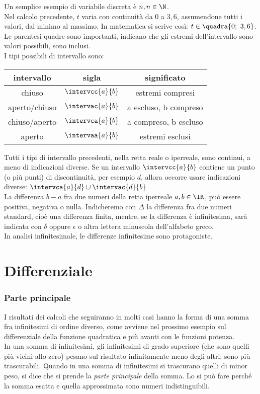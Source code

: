 Un semplice esempio di variabile discreta è $n, n\in \N$.\\
Nel calcolo precedente, $t$ varia con continuità da $0$ a $3,6$,
assumendone tutti i valori, dal minimo al massimo. In matematica si scrive 
così:
\(t\in \quadra{0;\ 3,6}\). Le parentesi quadre sono importanti, indicano che 
gli estremi
dell'intervallo sono valori possibili, sono inclusi.\\
I tipi possibili di intervallo sono:

\begin{center}
\begin{tabular}{ccc}\toprule
intervallo & sigla & significato\\\midrule
chiuso &$\intervcc{a}{b}$  & estremi compresi\\
aperto/chiuso & $\intervac{a}{b}$ & a escluso, b compreso\\
chiuso/aperto & $\intervca{a}{b}$ & a compreso, b escluso\\
aperto & $\intervaa{a}{b}$ & estremi esclusi\\\bottomrule
\end{tabular}
\label{tab:diff_tipiinterv}
\end{center}

Tutti i tipi di intervallo precedenti, nella retta reale o iperreale, sono
continui, a meno di indicazioni diverse. Se un intervallo $\intervcc{a}{b}$ 
contiene un punto
(o più punti) di discontinuità, per esempio $d$, allora occorre usare 
indicazioni
diverse: $\intervca{a}{d}\cup\intervac{d}{b}$\\ 
La differenza $b-a$ fra due numeri della retta iperreale $a, b \in \IR$, 
può essere positiva, negativa o nulla. Indicheremo con $\Delta$ la 
differenza fra due numeri standard, cioè una differenza finita, mentre, se la 
differenza è infinitesima, sarà indicata con $\delta$ oppure $\epsilon$
o altra lettera minuscola dell'alfabeto greco.\\
In analisi infinitesimale, le differenze infinitesime sono protagoniste.


\section{Differenziale}
\label{sec:diff01_differenziale}

\subsubsection{Parte principale}
\label{subsubsec:diff01_parteprincipale}
I risultati dei calcoli che seguiranno in molti casi hanno la forma di una 
somma fra infinitesimi di ordine diverso, come avviene nel prossimo esempio 
sul differenziale della funzione quadratica e più avanti con le funzioni 
potenza.\\
In una somma di infinitesimi, gli infinitesimi di
grado superiore (che sono quelli più vicini allo zero) pesano 
sul risultato infinitamente meno degli altri: sono più trascurabili.
Quando in una somma di infinitesimi si trascurano quelli di minor peso,
si dice che si prende la \emph{parte principale} della somma.
Lo si può fare perché la somma esatta e quella approssimata sono 
numeri indistinguibili.

